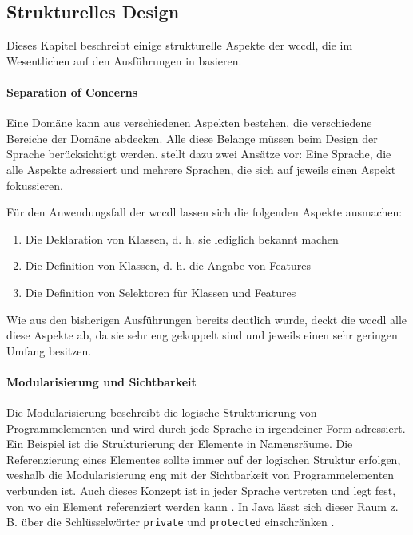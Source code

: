 \subsection{Strukturelles Design}
    Dieses Kapitel beschreibt einige strukturelle Aspekte der \gls{wccdl},
    die im Wesentlichen auf den Ausführungen in \cite[Kapitel 4, 5.1]{voelter:DslEngineering}
    basieren.

    \paragraph{Separation of Concerns}
    Eine Domäne kann aus verschiedenen Aspekten bestehen,
    die verschiedene Bereiche der Domäne abdecken.
    Alle diese Belange müssen beim Design der Sprache berücksichtigt werden.
    \citet[Kapitel 4.1]{voelter:DslEngineering}
    stellt dazu zwei Ansätze vor: Eine Sprache, die alle Aspekte adressiert
    und mehrere Sprachen, die sich auf jeweils einen Aspekt fokussieren.

    Für den Anwendungsfall der \gls{wccdl} lassen sich die
    folgenden Aspekte ausmachen:

    \begin{enumerate}
        \item Die Deklaration von Klassen, d. h. sie lediglich bekannt machen
        \item Die Definition von Klassen, d. h. die Angabe von Features
        \item Die Definition von Selektoren für Klassen und Features
    \end{enumerate}

    Wie aus den bisherigen Ausführungen bereits deutlich wurde,
    deckt die \gls{wccdl} alle diese Aspekte ab,
    da sie sehr eng gekoppelt sind und jeweils einen sehr geringen Umfang besitzen.

    \paragraph{Modularisierung und Sichtbarkeit}
    Die Modularisierung beschreibt die logische Strukturierung
    von Programmelementen und wird durch jede Sprache in irgendeiner Form adressiert.
    Ein Beispiel ist die Strukturierung der Elemente in Namensräume.
    Die Referenzierung eines Elementes sollte immer auf der logischen
    Struktur erfolgen, weshalb die Modularisierung eng mit der Sichtbarkeit
    von Programmelementen verbunden ist.
    Auch dieses Konzept ist in jeder Sprache vertreten und legt fest,
    von wo ein Element referenziert werden kann
    \cite[Kapitel 5.1.1]{voelter:DslEngineering}.
    In Java lässt sich dieser Raum z. B. über die Schlüsselwörter
    \texttt{private} und \texttt{protected} einschränken
    \cite[Kapitel 6.6]{oracle:javaSpec}.

